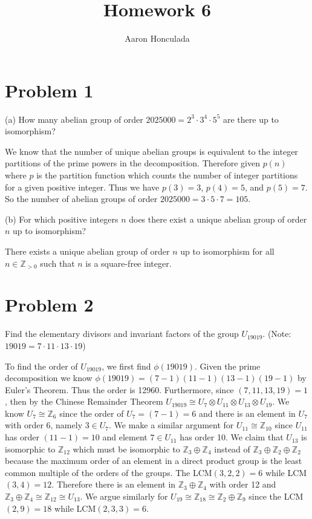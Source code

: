 \documentclass{article}
\title{Homework 6}
\author{Aaron Honculada}
\date{\monthname[\month] \the\year}
\theoremstyle{plain} %
\theoremstyle{definition} %
\newcommand{\bbZ}{\mathbb{Z}}
\begin{document}
\maketitle

\section*{Problem 1}
\noindent(a) How many abelian group of order $2025000 = 2^3 \cdot
3^4 \cdot 5^5$ are there up to isomorphism?

We know that the number of unique abelian groups is equivalent
to the integer partitions of the prime powers in the decomposition.
Therefore given $p(n)$ where $p$ is the partition function which
counts the number of integer partitions for a given positive integer.
Thus we have $p(3)=3$, $p(4)=5$, and $p(5)=7$. So the number of 
abelian groups of order $2025000 = 3 \cdot 5 \cdot 7 = \boxed{105}$.

\noindent(b) For which positive integers $n$ does there exist
a unique abelian group of order $n$ up to isomorphism?

There exists a unique abelian group of order $n$ up to isomorphism
for all $n \in \mathbb{Z}_{>0}$ such that $n$ is a square-free integer.

\section*{Problem 2}
\noindent Find the elementary divisors and invariant factors of
the group $U_{19019}$. (Note: $19019 = 7\cdot 11 \cdot 13 \cdot 19$)

To find the order of $U_{19019}$, we first find $\phi(19019)$.
Given the prime decomposition we know $\phi(19019) = (7-1)(11-1)(13-1)(19-1)$
by Euler's Theorem. Thus the order is 12960. Furthermore, since
$(7,11,13,19) = 1$, then by the Chinese Remainder Theorem 
$U_{19019} \cong U_{7} \otimes U_{11} \otimes U_{13} \otimes U_{19}$.
We know $U_7 \cong \bbZ_6$ since the order of $U_7=(7-1)=6$ and
there is an element in $U_7$ with order 6, namely $3\in U_7$.
We make a similar argument for $U_{11} \cong \bbZ_{10}$ since $U_{11}$ has order
$(11-1)=10$ and element $7\in U_{11}$ has order 10. We claim that
$U_{13}$ is isomorphic to $\bbZ_{12}$ which must be isomorphic to
$\bbZ_3 \oplus \bbZ_4$ instead of $\bbZ_3 \oplus \bbZ_2 \oplus \bbZ_2$
because the maximum order of an element in a direct product group is
the least common multiple of the orders of the groups. The LCM$(3,2,2)=6$ while
LCM$(3,4)=12$. Therefore there is an element in
$\bbZ_3 \oplus \bbZ_4$ with order 12 and $\bbZ_3 \oplus \bbZ_4 \cong \bbZ_{12} \cong U_{13}$.
We argue similarly for $U_{19} \cong \bbZ_{18} \cong \bbZ_2 \oplus \bbZ_9$ since the LCM$(2,9)=18$ while
LCM$(2,3,3)=6$.
\end{document}

